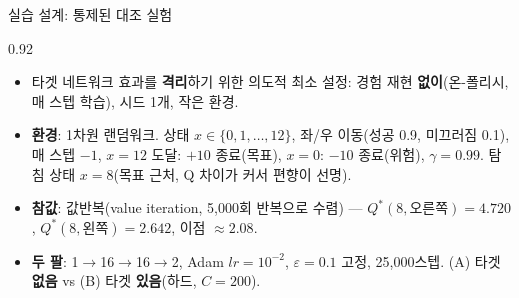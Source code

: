 \begin{frame}{실습 설계: 통제된 대조 실험}
\begin{center}\begin{varwidth}{0.92\textwidth}
  \begin{itemize}
    \item 타겟 네트워크 효과를 \textbf{격리}하기 위한 의도적 최소 설정:
      경험 재현 \textbf{없이}(온-폴리시, 매 스텝 학습), 시드 1개, 작은 환경.
  \end{itemize}
  \small
  \begin{itemize}
    \item \textbf{환경}: 1차원 랜덤워크. 상태 $x \in \{0,1,\dots,12\}$,
      좌/우 이동(성공 0.9, 미끄러짐 0.1), 매 스텝 $-1$,
      $x=12$ 도달: $+10$ 종료(목표), $x=0$: $-10$ 종료(위험),
      $\gamma = 0.99$. 탐침 상태 \textbf{$x=8$}(목표 근처, Q 차이가 커서
      편향이 선명).
    \item \textbf{참값}: 값반복(value iteration, 5,000회 반복으로 수렴) ---
      $Q^{*}(8,\text{오른쪽}) = 4.720$, $Q^{*}(8,\text{왼쪽}) = 2.642$,
      이점 $\approx 2.08$.
    \item \textbf{두 팔}: 1$\to$16$\to$16$\to$2, Adam $lr = 10^{-2}$,
      $\varepsilon = 0.1$ 고정, 25,000스텝.
      (A) 타겟 \textbf{없음} vs (B) 타겟 \textbf{있음}(하드, $C = 200$).
  \end{itemize}
  \normalsize
\end{varwidth}\end{center}
\end{frame}

